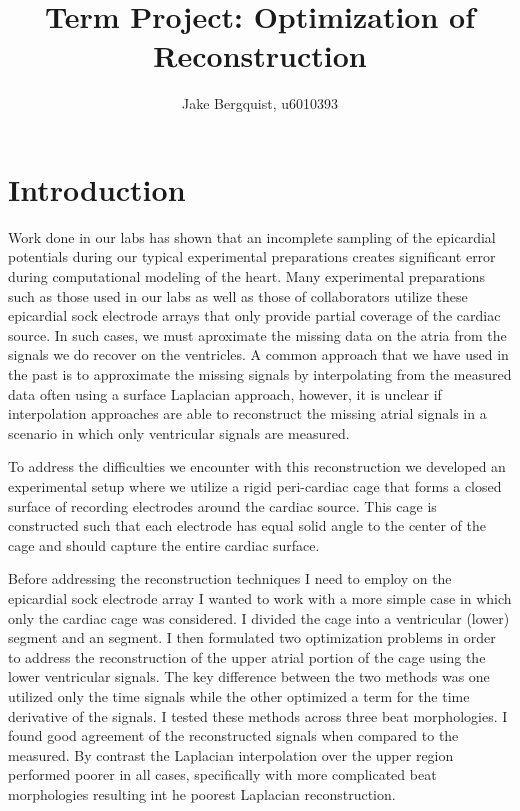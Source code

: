 \documentclass[12pt]{article}
\begin{document}
\title{Term Project: Optimization of Reconstruction}
\author{Jake Bergquist, u6010393 }
\maketitle

\section{Introduction}
Work done in our labs has shown that an incomplete sampling of the epicardial
potentials during our typical experimental preparations creates significant error
during computational modeling of the heart.\cite{RSM:Tat2018b} Many experimental preparations such as those used in our labs as well as those of collaborators utilize these epicardial sock electrode arrays that only provide partial coverage of the cardiac source.\cite{RSM:Bur2018b,Zenger2019,RSM:Goo2018,RSM:Bea2015a} In such
cases, we must aproximate the missing data on the atria from the signals we do recover on the ventricles. A
common approach that we have used in the past is to approximate the missing signals by interpolating from the
measured data often using a surface Laplacian approach, however, it is
unclear if interpolation approaches are able to reconstruct the missing
atrial signals in a scenario in which only ventricular signals are
measured.\cite{Huiskamp1991}

To address the difficulties we encounter with this reconstruction we developed an experimental setup where we utilize a rigid peri-cardiac cage that forms a closed surface of recording electrodes around the cardiac source. This cage is constructed such that each electrode has equal solid angle to the center of the cage and should capture the entire cardiac surface.

Before addressing the reconstruction techniques I need to employ on the epicardial sock electrode array I wanted to work with a more simple case in which only the cardiac cage was considered. I divided the cage into a ventricular (lower) segment and an segment. I then formulated two optimization problems in order to address the reconstruction of the upper atrial portion of the cage using the lower ventricular signals. The key difference between the two methods was one utilized only the time signals while the other optimized a term for the time derivative of the signals. I tested these methods across three beat morphologies. I found good agreement of the reconstructed signals when compared to the measured. By contrast the Laplacian interpolation over the upper region performed poorer in all cases, specifically with more complicated beat morphologies resulting int he poorest Laplacian reconstruction.
\end{document}
